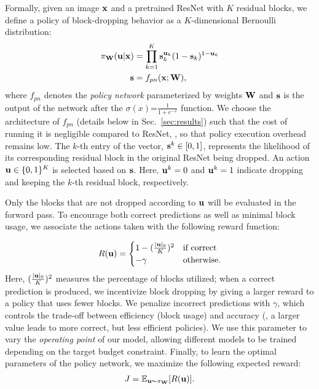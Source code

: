 \documentclass[10pt,twocolumn,letterpaper]{article}
\begin{document}
Formally, given an image ${\bf x}$ and a pretrained ResNet with $K$ residual blocks, we define a policy of block-dropping behavior as a $K$-dimensional Bernoulli distribution:
\begin{align}
\pi_{\bf W} ({\bf u}|{\bf x}) & = \prod_{k=1}^{K} {\bf s}_k^{{\bf u}_k}(1-{\bf s}_k)^{1-{\bf u}_k} \\
{\bf s}  & = f_{pn}({\bf x}; {\bf W}),
\end{align} 
where $f_{pn}$ denotes the \emph{policy network} parameterized by weights ${\bf W}$ and ${\bf s}$ is the output of the network after the \texttt{$\sigma(x)$}=$\frac{1}{1+e^{-x}}$ function. We choose the architecture of $f_{pn}$ (details below in Sec.~\ref{sec:results}) such that the cost of running it is negligible compared to ResNet, \ie, so that policy execution overhead remains low. %
The $k$-th entry of the vector, ${\bf s}^k \in [0, 1]$, represents the likelihood of its corresponding residual block in the original ResNet being dropped. An action ${\bf u}\in \{0, 1\}^{K}$ is selected based on ${\bf s}$. Here, ${\bf u}^k=0 $ and ${\bf u}^k=1 $ indicate dropping and keeping the $k$-th residual block, respectively.

Only the blocks that are not dropped according to ${\bf u}$ will be evaluated in the forward pass. To encourage both correct predictions as well as minimal block usage, we associate the actions taken with the following reward function:

\begin{align}
R({\bf u}) = 
\begin{cases}
    1- (\frac{ |{\bf u}|_0 }{K})^2   & \text{if correct}\\
    -\gamma     & \text{otherwise.} \\
\end{cases}
\label{eqn:reward}
\end{align}
Here, $(\frac{ |{\bf u}|_0 }{K})^2$ measures the percentage of blocks utilized; when a correct prediction is produced, we incentivize block dropping by giving a larger reward to a policy that uses fewer blocks. We penalize incorrect predictions with $\gamma$, which controls the trade-off between efficiency (block usage) and accuracy (\ie, a larger value leads to more correct, but less efficient policies). We use this parameter to vary the \emph{operating point} of our model, allowing different models to be trained depending on the target budget constraint.  Finally, to learn the optimal parameters of the policy network, we maximize the following expected reward:
\begin{align}
J = \mathbb{E}_{{\bf u}\thicksim {\bf \pi}_{\bf W}}[ R({\bf u})].
\label{eqn:expectation} 
\end{align}
\end{document}

